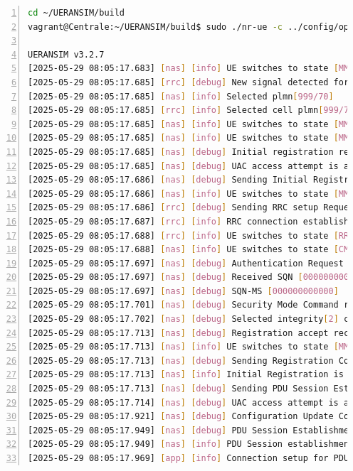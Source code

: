 \begin{lstlisting}[basicstyle=\small, frame=single, breaklines=true, postbreak=\mbox{\textcolor{red}{$\hookrightarrow$}\space}, escapeinside ={\%,}, escapechar={!}, numbers=left, language=sh, caption=UE run en resultaat]
cd ~/UERANSIM/build
vagrant@Centrale:~/UERANSIM/build$ sudo ./nr-ue -c ../config/open5gs-ue.yaml

UERANSIM v3.2.7
[2025-05-29 08:05:17.683] [nas] [info] UE switches to state [MM-DEREGISTERED/PLMN-SEARCH]
[2025-05-29 08:05:17.685] [rrc] [debug] New signal detected for cell[1], total [1] cells in coverage
[2025-05-29 08:05:17.685] [nas] [info] Selected plmn[999/70]
[2025-05-29 08:05:17.685] [rrc] [info] Selected cell plmn[999/70] tac[1] category[SUITABLE]
[2025-05-29 08:05:17.685] [nas] [info] UE switches to state [MM-DEREGISTERED/PS]
[2025-05-29 08:05:17.685] [nas] [info] UE switches to state [MM-DEREGISTERED/NORMAL-SERVICE]
[2025-05-29 08:05:17.685] [nas] [debug] Initial registration required due to [MM-DEREG-NORMAL-SERVICE]
[2025-05-29 08:05:17.685] [nas] [debug] UAC access attempt is allowed for identity[0], category[MO_sig]
[2025-05-29 08:05:17.686] [nas] [debug] Sending Initial Registration
[2025-05-29 08:05:17.686] [nas] [info] UE switches to state [MM-REGISTER-INITIATED]
[2025-05-29 08:05:17.686] [rrc] [debug] Sending RRC setup Request
[2025-05-29 08:05:17.687] [rrc] [info] RRC connection established
[2025-05-29 08:05:17.688] [rrc] [info] UE switches to state [RRC-CONNECTED]
[2025-05-29 08:05:17.688] [nas] [info] UE switches to state [CM-CONNECTED]
[2025-05-29 08:05:17.697] [nas] [debug] Authentication Request received
[2025-05-29 08:05:17.697] [nas] [debug] Received SQN [000000000101]
[2025-05-29 08:05:17.697] [nas] [debug] SQN-MS [000000000000]
[2025-05-29 08:05:17.701] [nas] [debug] Security Mode Command received
[2025-05-29 08:05:17.702] [nas] [debug] Selected integrity[2] ciphering[0]
[2025-05-29 08:05:17.713] [nas] [debug] Registration accept received
[2025-05-29 08:05:17.713] [nas] [info] UE switches to state [MM-REGISTERED/NORMAL-SERVICE]
[2025-05-29 08:05:17.713] [nas] [debug] Sending Registration Complete
[2025-05-29 08:05:17.713] [nas] [info] Initial Registration is successful
[2025-05-29 08:05:17.713] [nas] [debug] Sending PDU Session Establishment Request
[2025-05-29 08:05:17.714] [nas] [debug] UAC access attempt is allowed for identity[0], category[MO_sig]
[2025-05-29 08:05:17.921] [nas] [debug] Configuration Update Command received
[2025-05-29 08:05:17.949] [nas] [debug] PDU Session Establishment Accept received
[2025-05-29 08:05:17.949] [nas] [info] PDU Session establishment is successful PSI[1]
[2025-05-29 08:05:17.969] [app] [info] Connection setup for PDU session[1] is successful, TUN interface[uesimtun0, 10.45.0.8] is up.
\end{lstlisting}

